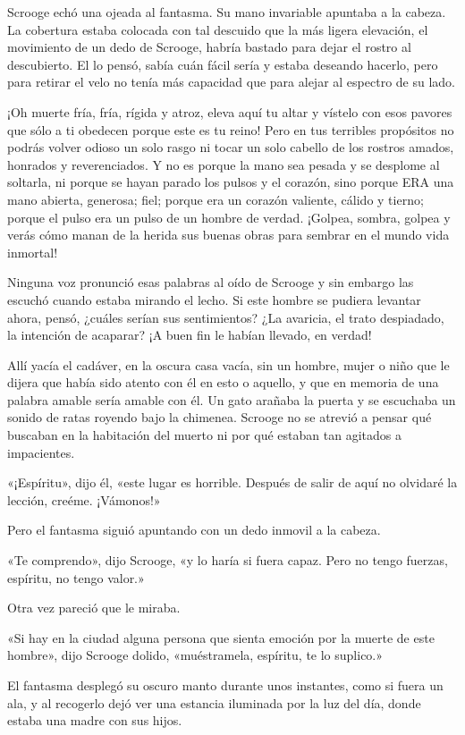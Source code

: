 \documentclass{novela}
\begin{document}
 Scrooge echó una ojeada al fantasma. Su mano invariable apuntaba a la cabeza. La cobertura estaba colocada con tal descuido que la más ligera elevación, el movimiento de un dedo de Scrooge, habría bastado para dejar el rostro al descubierto. El lo pensó, sabía cuán fácil sería y estaba deseando hacerlo, pero para retirar el velo no tenía más capacidad que para alejar al espectro de su lado.

 ¡Oh muerte fría, fría, rígida y atroz, eleva aquí tu altar y vístelo con esos pavores que sólo a ti obedecen porque este es tu reino! Pero en tus terribles propósitos no podrás volver odioso un solo rasgo ni tocar un solo cabello de los rostros amados, honrados y reverenciados. Y no es porque la mano sea pesada y se desplome al soltarla, ni porque se hayan parado los pulsos y el corazón, sino porque ERA una mano abierta, generosa; fiel; porque era un corazón valiente, cálido y tierno; porque el pulso era un pulso de un hombre de verdad. ¡Golpea, sombra, golpea y verás cómo manan de la herida sus buenas obras para sembrar en el mundo vida inmortal!

 Ninguna voz pronunció esas palabras al oído de Scrooge y sin embargo las escuchó cuando estaba mirando el lecho. Si este hombre se pudiera levantar ahora, pensó, ¿cuáles serían sus sentimientos? ¿La avaricia, el trato despiadado, la intención de acaparar? ¡A buen fin le habían llevado, en verdad!

 Allí yacía el cadáver, en la oscura casa vacía, sin un hombre, mujer o niño que le dijera que había sido atento con él en esto o aquello, y que en memoria de una palabra amable sería amable con él. Un gato arañaba la puerta y se escuchaba un sonido de ratas royendo bajo la chimenea. Scrooge no se atrevió a pensar qué buscaban en la habitación del muerto ni por qué estaban tan agitados a impacientes.

 «¡Espíritu», dijo él, «este lugar es horrible. Después de salir de aquí no olvidaré la lección, creéme. ¡Vámonos!»

 Pero el fantasma siguió apuntando con un dedo inmovil a la cabeza.

 «Te comprendo», dijo Scrooge, «y lo haría si fuera capaz. Pero no tengo fuerzas, espíritu, no tengo valor.»

 Otra vez pareció que le miraba.

 «Si hay en la ciudad alguna persona que sienta emoción por la muerte de este hombre», dijo Scrooge dolido, «muéstramela, espíritu, te lo suplico.»

 El fantasma desplegó su oscuro manto durante unos instantes, como si fuera un ala, y al recogerlo dejó ver una estancia iluminada por la luz del día, donde estaba una madre con sus hijos.
\end{document}
